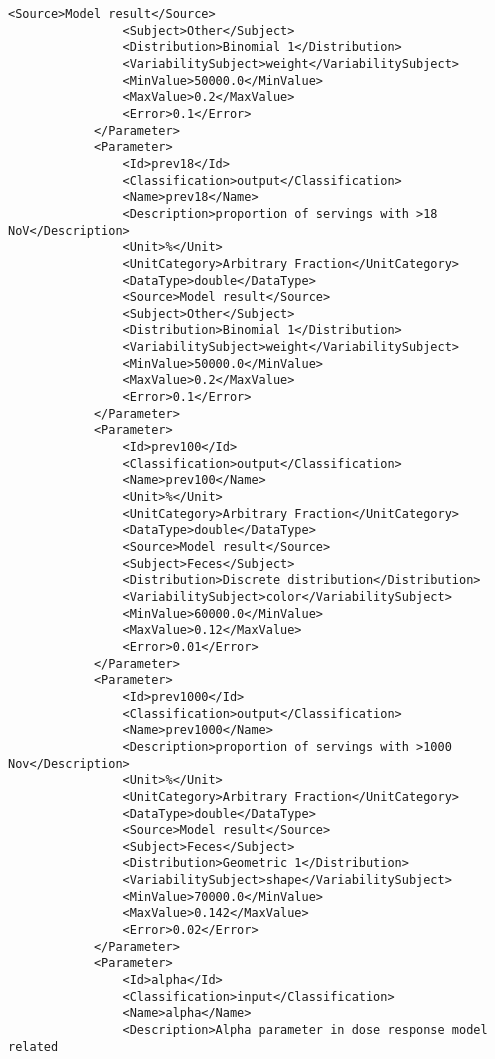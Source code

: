 \begin{lstlisting}[language=RAKIP, caption={Example of GenericModel}]
                <Source>Model result</Source>
                <Subject>Other</Subject>
                <Distribution>Binomial 1</Distribution>
                <VariabilitySubject>weight</VariabilitySubject>
                <MinValue>50000.0</MinValue>
                <MaxValue>0.2</MaxValue>
                <Error>0.1</Error>
            </Parameter>
            <Parameter>
                <Id>prev18</Id>
                <Classification>output</Classification>
                <Name>prev18</Name>
                <Description>proportion of servings with >18 NoV</Description>
                <Unit>%</Unit>
                <UnitCategory>Arbitrary Fraction</UnitCategory>
                <DataType>double</DataType>
                <Source>Model result</Source>
                <Subject>Other</Subject>
                <Distribution>Binomial 1</Distribution>
                <VariabilitySubject>weight</VariabilitySubject>
                <MinValue>50000.0</MinValue>
                <MaxValue>0.2</MaxValue>
                <Error>0.1</Error>
            </Parameter>
            <Parameter>
                <Id>prev100</Id>
                <Classification>output</Classification>
                <Name>prev100</Name>
                <Unit>%</Unit>
                <UnitCategory>Arbitrary Fraction</UnitCategory>
                <DataType>double</DataType>
                <Source>Model result</Source>
                <Subject>Feces</Subject>
                <Distribution>Discrete distribution</Distribution>
                <VariabilitySubject>color</VariabilitySubject>
                <MinValue>60000.0</MinValue>
                <MaxValue>0.12</MaxValue>
                <Error>0.01</Error>
            </Parameter>
            <Parameter>
                <Id>prev1000</Id>
                <Classification>output</Classification>
                <Name>prev1000</Name>
                <Description>proportion of servings with >1000 Nov</Description>
                <Unit>%</Unit>
                <UnitCategory>Arbitrary Fraction</UnitCategory>
                <DataType>double</DataType>
                <Source>Model result</Source>
                <Subject>Feces</Subject>
                <Distribution>Geometric 1</Distribution>
                <VariabilitySubject>shape</VariabilitySubject>
                <MinValue>70000.0</MinValue>
                <MaxValue>0.142</MaxValue>
                <Error>0.02</Error>
            </Parameter>
            <Parameter>
                <Id>alpha</Id>
                <Classification>input</Classification>
                <Name>alpha</Name>
                <Description>Alpha parameter in dose response model related

\end{lstlisting}
